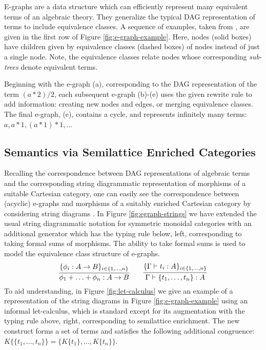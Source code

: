 E-graphs are a data structure which can efficiently represent many equivalent terms of an algebraic theory.  They generalize the typical DAG representation of terms to include equivalence classes. 
A sequence of examples, taken from \cite{EggPaper}, are given in the first row of Figure \ref{fig:e-graph-example}. Here,  nodes (solid boxes) have children given by equivalence classes (dashed boxes) of nodes instead of just a single node.  Note, the equivalence classes relate nodes whose corresponding \textit{sub-trees} denote equivalent terms. 

Beginning with the e-graph (a), corresponding to the DAG representation of the term $(a*2)/2$, each subsequent e-graph (b)-(e) uses the given rewrite rule to add information: creating new nodes and edges, or merging equivalence classes. The final e-graph, (e), contains a cycle, and represents infinitely many terms: $a, a*1, (a*1)*1, $... 

\subsection{Semantics via Semilattice Enriched Categories}

Recalling the correspondence between DAG representations of algebraic terms and the corresponding string diagrammatic representation of morphisms of a suitable Cartesian category, 
one can easily see the correspondence between (acyclic) e-graphs and morphisms of a suitably enriched Cartesian category by considering string diagrams 
\cite{noauthor_09083347_nodate,joyal_geometry_1991, mellies_functorial_2006}. In Figure \ref{fig:egraph-strings} we have extended the usual string diagrammatic notation for symmetric monoidal categories with an additional generator which has the  typing rule below, left, corresponding to taking formal sums of morphisms.
The ability to take formal sums is used to model the equivalence class structure of e-graphs.  
\[
\infer{\phi_1 + \ldots + \phi_n: A \to B}{\{\phi_i: A \to B\}_{i \in \{1,\ldots,n\}}}
\qquad
\infer{\Gamma \vdash \{t_1, \ldots, t_n\}: A}{\{\Gamma \vdash t_i: A\}_{i \in \{1, \ldots, n\}}}
\]
To aid understanding, in Figure \ref{fig:let-calculus} we give an example of a representation of the string diagrams in Figure \ref{fig:e-graph-example} using an informal let-calculus, which is standard except for its augmentation with the typing rule above, right, corresponding to semilattice enrichment. The new construct forms a set of terms and satisfies the following additional congruence: $K\{\{t_1, \ldots, t_n\}\} = \{K\{t_1\}, \ldots, K\{t_n\}\}$. 

